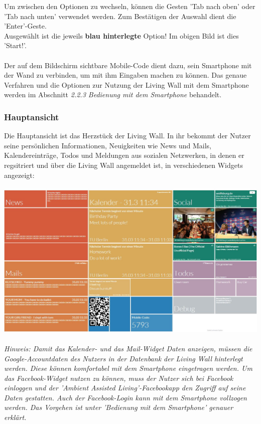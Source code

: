 \documentclass[10pt,a4paper]{report}
\begin{document}
		Um zwischen den Optionen zu wechseln, können die Gesten 'Tab nach oben' oder 'Tab nach unten' verwendet werden. Zum Bestätigen der Auswahl dient die 'Enter'-Geste.\\
Ausgewählt ist die jeweils \textbf{blau hinterlegte} Option! Im obigen Bild ist dies 'Start!'.\\ \\
Der auf dem Bildschirm sichtbare Mobile-Code dient dazu, sein Smartphone mit der Wand zu verbinden, um mit ihm Eingaben machen zu können. Das genaue Verfahren und die Optionen zur Nutzung der Living Wall mit dem Smartphone werden im Abschnitt 	\textit{2.2.3 Bedienung mit dem Smartphone} behandelt.

		\subsubsection{Hauptansicht}
		Die Hauptansicht ist das Herzstück der Living Wall. In ihr bekommt der Nutzer seine persönlichen Informationen, Neuigkeiten wie News und Mails, Kalendereinträge, Todos und Meldungen aus sozialen Netzwerken, in denen er regsitriert und über die Living Wall angemeldet ist, in verschiedenen Widgets angezeigt:\\\\
		\includegraphics[scale=0.31]{Main}\\\\
		\textit{Hinweis: Damit das Kalender- und das Mail-Widget Daten anzeigen, müssen die Google-Accountdaten des Nutzers in der Datenbank der Living Wall hinterlegt werden. Diese können komfortabel mit dem Smartphone eingetragen werden. Um das Facebook-Widget nutzen zu können, muss der Nutzer sich bei Facebook einloggen und der 'Ambient Assisted Living'-Facebookapp den Zugriff auf seine Daten gestatten. Auch der Facebook-Login kann mit dem Smartphone vollzogen werden. Das Vorgehen ist unter 'Bedienung mit dem Smartphone' genauer erklärt.}\\ \\
\end{document}

